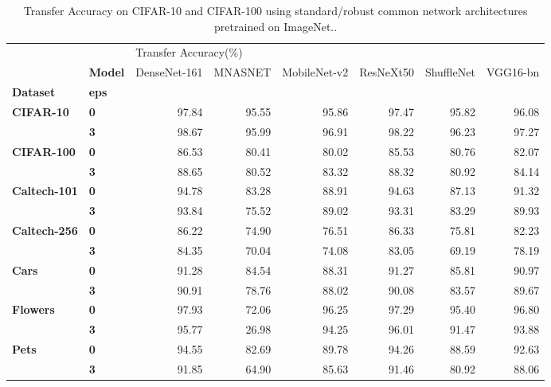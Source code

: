 \begin{table}
\centering
\caption{Transfer Accuracy on CIFAR-10 and CIFAR-100 using standard/robust common network architectures pretrained on ImageNet..}
\label{table:transfer-vary-arch}
\begin{tabular}{llrrrrrr}
\toprule
     & {} & \multicolumn{6}{l}{Transfer Accuracy(\%)} \\
     & \textbf{Model} &         DenseNet-161 & MNASNET & MobileNet-v2 & ResNeXt50 & ShuffleNet & VGG16-bn \\
\textbf{Dataset} & \textbf{eps} &                      &         &              &           &            &          \\
\midrule
\multirow{2}{*}{\textbf{CIFAR-10}} & \textbf{0} &                97.84 &   95.55 &        95.86 &     97.47 &      95.82 &    96.08 \\
     & \textbf{3} &                98.67 &   95.99 &        96.91 &     98.22 &      96.23 &    97.27 \\
\cline{1-8}
\multirow{2}{*}{\textbf{CIFAR-100}} & \textbf{0} &                86.53 &   80.41 &        80.02 &     85.53 &      80.76 &    82.07 \\
     & \textbf{3} &                88.65 &   80.52 &        83.32 &     88.32 &      80.92 &    84.14 \\
\cline{1-8}
\multirow{2}{*}{\textbf{Caltech-101}} & \textbf{0} &                94.78 &   83.28 &        88.91 &     94.63 &      87.13 &    91.32 \\
     & \textbf{3} &                93.84 &   75.52 &        89.02 &     93.31 &      83.29 &    89.93 \\
\cline{1-8}
\multirow{2}{*}{\textbf{Caltech-256}} & \textbf{0} &                86.22 &   74.90 &        76.51 &     86.33 &      75.81 &    82.23 \\
     & \textbf{3} &                84.35 &   70.04 &        74.08 &     83.05 &      69.19 &    78.19 \\
\cline{1-8}
\multirow{2}{*}{\textbf{Cars}} & \textbf{0} &                91.28 &   84.54 &        88.31 &     91.27 &      85.81 &    90.97 \\
     & \textbf{3} &                90.91 &   78.76 &        88.02 &     90.08 &      83.57 &    89.67 \\
\cline{1-8}
\multirow{2}{*}{\textbf{Flowers}} & \textbf{0} &                97.93 &   72.06 &        96.25 &     97.29 &      95.40 &    96.80 \\
     & \textbf{3} &                95.77 &   26.98 &        94.25 &     96.01 &      91.47 &    93.88 \\
\cline{1-8}
\multirow{2}{*}{\textbf{Pets}} & \textbf{0} &                94.55 &   82.69 &        89.78 &     94.26 &      88.59 &    92.63 \\
     & \textbf{3} &                91.85 &   64.90 &        85.63 &     91.46 &      80.92 &    88.06 \\
\bottomrule
\end{tabular}
\end{table}

